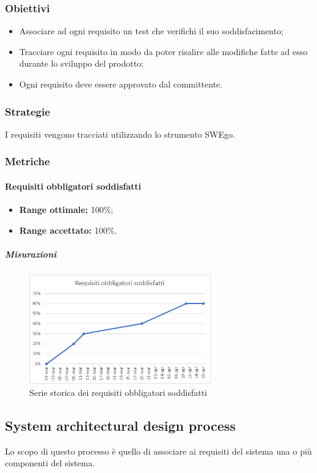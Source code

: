 \subsubsection{Obiettivi}
\begin{itemize}
	\item Associare ad ogni requisito un test che verifichi il suo soddisfacimento; 
	\item Tracciare ogni requisito in modo da poter risalire alle modifiche fatte ad esso durante lo sviluppo del prodotto;
	\item Ogni requisito deve essere approvato dal committente.
\end{itemize}
\subsubsection{Strategie}
I requisiti vengono tracciati utilizzando lo strumento SWEgo.
\subsubsection{Metriche}
\paragraph{Requisiti obbligatori soddisfatti} \Spazio
\begin{itemize}
	\item \textbf{Range ottimale:} 100\%;
	\item \textbf{Range accettato:} 100\%.
\end{itemize}
\subparagraph{Misurazioni}
\begin{figure}[H]
	\centering 
	\includegraphics[width=0.7\textwidth]{Images/obbl.png}
	\caption{Serie storica dei requisiti obbligatori soddisfatti}
	\label{obbl} 
\end{figure}

\subsection{System architectural design process}
Lo scopo di questo processo è quello di associare ai requisiti del sistema una o più componenti del sistema.
